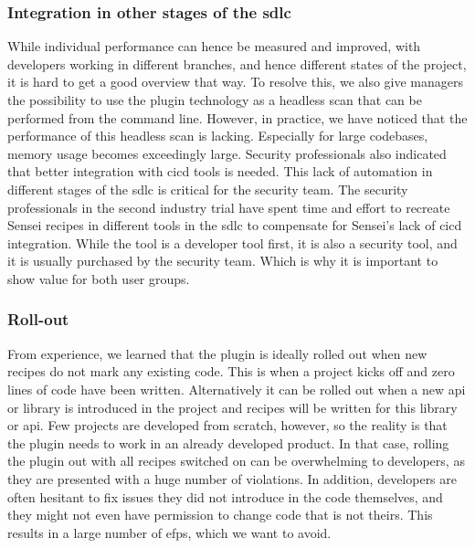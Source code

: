 \subsubsection{Integration in other stages of the \gls{sdlc}}
While individual performance can hence be measured and improved, with developers working in different branches, and hence different states of the project, it is hard to get a good overview that way.
To resolve this, we also give managers the possibility to use the plugin technology as a headless scan that can be performed from the command line.
However, in practice, we have noticed that the performance of this headless scan is lacking.
Especially for large codebases, memory usage becomes exceedingly large.
Security professionals also indicated that better integration with \gls{cicd} tools is needed.
This lack of automation in different stages of the \gls{sdlc} is critical for the security team.
The security professionals in the second industry trial have spent time and effort to recreate Sensei recipes in different tools in the \gls{sdlc} to compensate for Sensei's lack of \gls{cicd} integration.
While the tool is a developer tool first, it is also a security tool, and it is usually purchased by the security team.
Which is why it is important to show value for both user groups.

\subsubsection{Roll-out}
From experience, we learned that the plugin is ideally rolled out when new recipes do not mark any existing code.
This is when a project kicks off and zero lines of code have been written. 
Alternatively it can be rolled out when a new \gls{api} or library is introduced in the project and recipes will be written for this library or \gls{api}.
Few projects are developed from scratch, however, so the reality is that the plugin needs to work in an already developed product.
In that case, rolling the plugin out with all recipes switched on can be overwhelming to developers, as they are presented with a huge number of violations.
In addition, developers are often hesitant to fix issues they did not introduce in the code themselves, and they might not even have permission to change code that is not theirs.
This results in a large number of \glspl{efp}, which we want to avoid.

